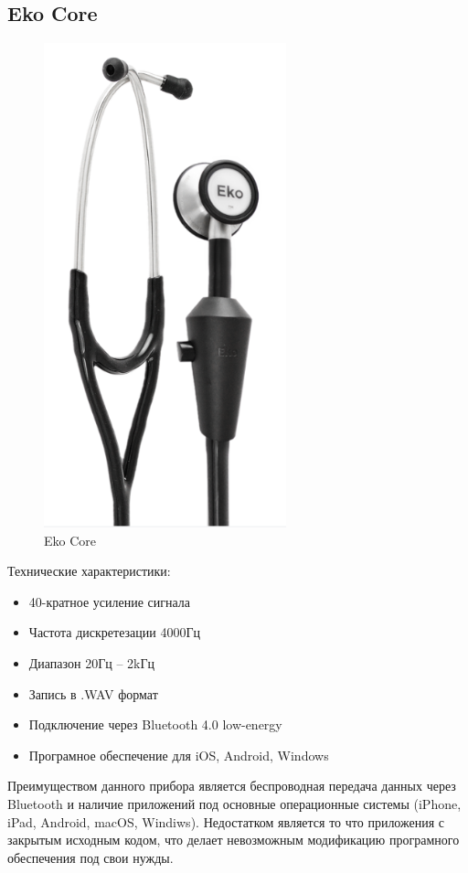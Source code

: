 \documentclass[../paper.tex]{subfiles}
\begin{document}
\subsection{Eko Core}
\begin{figure}[H]
\centering
\includegraphics[width=7cm]{images/eko-core}
\caption{Eko Core}
\end{figure}

Технические характеристики:\cite{eko-core}
\begin{itemize}
  \item 40-кратное усиление сигнала
  \item Частота дискретезации 4000Гц
  \item Диапазон 20Гц – 2kГц
  \item Запись в .WAV формат
  \item Подключение через Bluetooth 4.0 low-energy
  \item Програмное обеспечение для iOS, Android, Windows
\end{itemize}

Преимуществом данного прибора является беспроводная передача данных через Bluetooth и наличие приложений под основные операционные системы (iPhone, iPad, Android, macOS, Windiws). Недостатком является то что приложения с закрытым исходным кодом, что делает невозможным модификацию програмного обеспечения под свои нужды.
\end{document}
